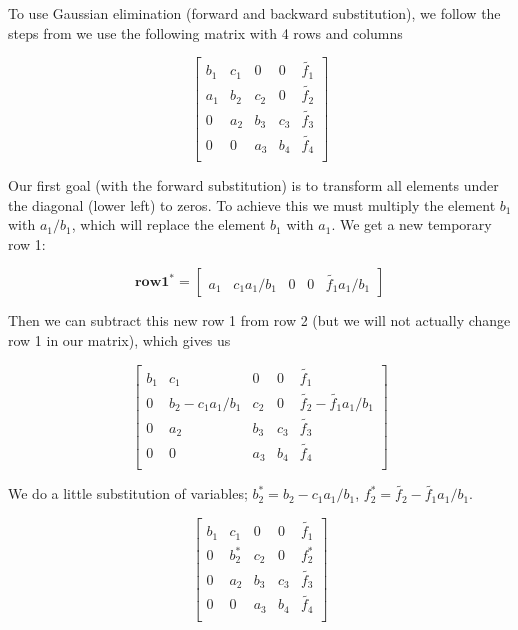 \documentclass[oneside, final, 11pt, english, twocolumn]{article}
\begin{document}
To use Gaussian elimination (forward and backward substitution), we follow the steps from \cite[s. 170-173]{stat}we use the following matrix with 4 rows and columns

\[
    \begin{bmatrix}
                           b_1& c_1& 0 &0 & \tilde{f_1}\\
                           a_1 & b_2 & c_2 &0 & \tilde{f_2} \\
                           0&a_2 &b_3 & c_3 & \tilde{f_3}\\
                           0&0 & a_3 & b_4 & \tilde{f_4}\\
                      \end{bmatrix}
\]

Our first goal (with the forward substitution) is to transform all elements under the diagonal (lower left) to zeros. To achieve this we must multiply the element $b_1$ with $a_1/b_1$, which will replace the element $b_1$ with $a_1$.  We get a new temporary row 1: 

\[
\mathbf{row 1^*} = 
\left[ {\begin{array}{ccc}
a_1  \, \, \, \, \, 
c_1a_1 /b_1 \, \, \, \, \, 
0 \, \, \, \, \, 
0 \, \, \, \, \, 
\tilde{f_1} a_1/b_1 
\end{array} } \right]
\]



Then we can subtract this new row 1 from row 2 (but we will not actually change row 1 in our matrix), which gives us

\[
    \begin{bmatrix}
                           b_1& c_1 & 0 &0 & \tilde{f_1}\\
                           0 & b_2 - c_1 a_1 / b_1 & c_2 &0 & \tilde{f_2} - \tilde{f_1} a_1 /b_1\\
                           0&a_2 &b_3 & c_3 & \tilde{f_3}\\
                           0&0 & a_3 & b_4 & \tilde{f_4}\\
                      \end{bmatrix}
\]

We do a little substitution of variables; $b^*_2 = b_2 - c_1 a_1/b_1$, $f^*_2 = \tilde{f_2} - \tilde{f_1} a_1 /b_1$. 

\[
    \begin{bmatrix}
                           b_1& c_1 & 0 &0 & \tilde{f_1}\\
                           0 & b^*_2 & c_2 &0 & f^*_2\\
                           0&a_2 &b_3 & c_3 & \tilde{f_3}\\
                           0&0 & a_3 & b_4 & \tilde{f_4}\\
                      \end{bmatrix}
\]
\end{document}
